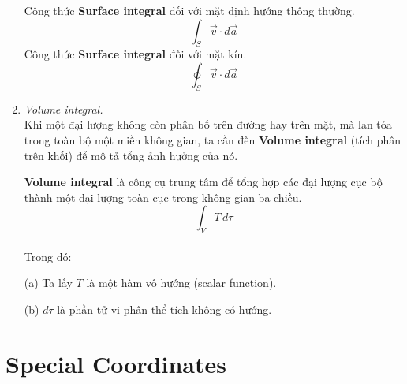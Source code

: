 \begin{enumerate}
Công thức \textbf{Surface integral} đối với mặt định hướng thông thường.
\[
\int_{S} \vec{v} \cdot d\vec{a}
\]
Công thức \textbf{Surface integral} đối với mặt kín.
\[
\oint_{S} \vec{v} \cdot d\vec{a}
\]

\item \textit{Volume integral.}\\
Khi một đại lượng không còn phân bố trên đường hay trên mặt, mà lan tỏa trong toàn bộ một miền không gian, ta cần đến \textbf{Volume integral} (tích phân trên khối) để mô tả tổng ảnh hưởng của nó.


\textbf{Volume integral} là công cụ trung tâm để tổng hợp các đại lượng cục bộ thành một đại lượng toàn cục trong không gian ba chiều.
\[
\int_{V} T\,d\tau
\]
\\ Trong đó:
\end{enumerate}
\begin{enumerate}
  \item[(a)] Ta lấy $T$ là một hàm vô hướng (scalar function).
  \item[(b)] $d\tau$ là phần tử vi phân thể tích không có hướng.
\end{enumerate}

\section{Special Coordinates}

